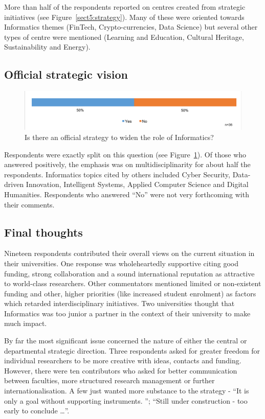 More than half of the respondents reported on centres created from strategic initiatives (see Figure~\ref{sect5:strategy}). Many of these were oriented towards Informatics themes (FinTech, Crypto-currencies, Data Science) but several other types of centre were mentioned (Learning and Education, Cultural Heritage, Sustainability and Energy).

\subsection{Official strategic vision}
\begin{figure}[h]
\centering
\includegraphics[width = \linewidth]{charts/5j.png}
\caption{Is there an official strategy to widen the role of Informatics?}
\label{sect5:official}
\end{figure}

Respondents were exactly split on this question (see Figure~\ref{sect5:official}). Of those who answered positively, the emphasis was on multidisciplinarity for about half the respondents. Informatics topics cited by others included Cyber Security, Data-driven Innovation, Intelligent Systems, Applied Computer Science and Digital Humanities. Respondents who answered ``No'' were not very forthcoming with their comments.

\subsection{Final thoughts}

Nineteen respondents contributed their overall views on the current situation in their universities. One response was wholeheartedly supportive citing good funding, strong collaboration and a sound international reputation as attractive to world-class researchers. Other commentators mentioned limited or non-existent funding and other, higher priorities (like increased student enrolment) as factors which retarded interdisciplinary initiatives. Two universities thought that Informatics was too junior a partner in the context of their university to make much impact.

By far the most significant issue concerned the nature of either the central or departmental strategic direction. Three respondents asked for greater freedom for individual researchers to be more creative with ideas, contacts and funding.  However, there were ten contributors who asked for better communication between faculties, more structured research management or further internationalisation. A few just wanted more substance to the strategy - ``It is only a goal without supporting instruments. '';  ``Still under construction - too early to conclude \ldots ''.




